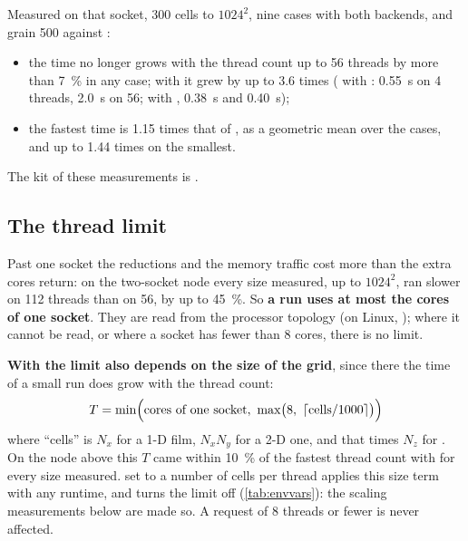 Measured on that socket, 300 cells to $1024^2$, nine cases with both
backends,  and grain 500 against :
\begin{itemize}
  \item the time no longer grows with the thread count up to 56 threads by
    more than \SI{7}{\percent} in any case; with  it grew by up
    to 3.6 times ( with : \SI{0.55}{\second}
    on 4 threads, \SI{2.0}{\second} on 56; with ,
    \SI{0.38}{\second} and \SI{0.40}{\second});
  \item the fastest time is 1.15 times that of , as a geometric
    mean over the cases, and up to 1.44 times on the smallest.
\end{itemize}
The kit of these measurements is .

\subsection{The thread limit}
\label{sec:parallel:cap}

Past one socket the reductions and the memory traffic cost more than the
extra cores return: on the two-socket node every size measured, up to
$1024^2$, ran slower on 112 threads than on 56, by up to \SI{45}{\percent}.
So \textbf{a run uses at most the cores of one socket}. They are read from the
processor topology (on Linux, );
where it cannot be read, or where a socket has fewer than 8 cores, there is no
limit.

\textbf{With  the limit also depends on the size of the grid},
since there the time of a small run does grow with the thread count:
\[
  T = \min\Bigl(\text{cores of one socket},\ \max\bigl(8,\ \lceil \text{cells} / 1000 \rceil\bigr)\Bigr)
\]
where ``cells'' is $N_x$ for a 1-D film, $N_x N_y$ for a 2-D one, and that
times $N_z$ for . On the node above this $T$ came within
\SI{10}{\percent} of the fastest thread count with  for every
size measured.  set to a number of cells per thread
applies this size term with any runtime, and  turns the limit off
(\cref{tab:envvars}): the scaling measurements below are made so. A request of
8 threads or fewer is never affected.

